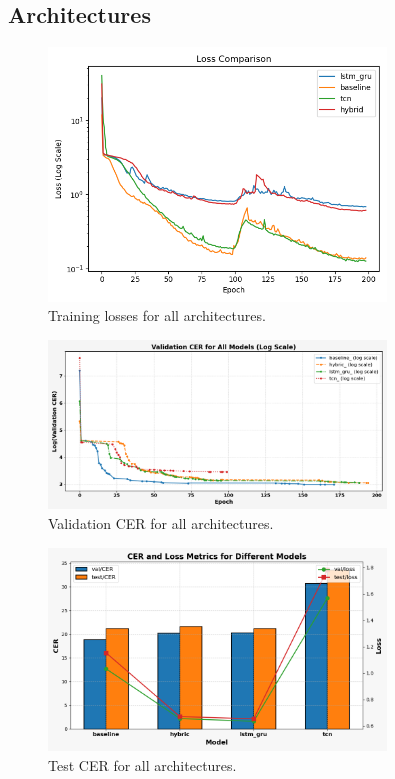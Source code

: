 \subsection{Architectures}

\begin{figure}
    \centering
    \includegraphics[width=0.8\textwidth]{figures/all_losses.png}
    \caption{Training losses for all architectures.}
\end{figure}

\begin{figure}
    \centering
    \includegraphics[width=0.8\textwidth]{figures/Val_cer.png}
    \caption{Validation CER for all architectures.}
\end{figure}

\begin{figure}
    \centering
    \includegraphics[width=0.8\textwidth]{figures/test.png}
    \caption{Test CER for all architectures.}
\end{figure}

